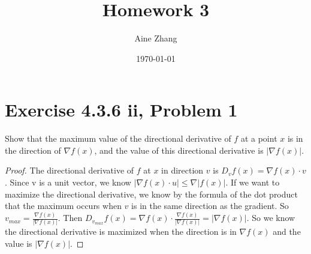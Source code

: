 \documentclass{article}
\title{Homework 3}
\author{Aine Zhang}
\date\today
\begin{document}
\maketitle %

\section*{Exercise 4.3.6 ii, Problem 1}
Show that the maximum value of the directional derivative of $f$ at a point $x$ is in the direction of $\nabla f(x)$, and the value of this directional derivative is $|\nabla f(x)|.$
\begin{proof}
    The directional derivative of $f$ at $x$ in direction $v$ is $D_vf(x)=\nabla f(x) \cdot v$. Since v is a unit vector, we know $|\nabla f(x) \cdot u |\leq \nabla |f(x)|$. If we want to maximize the directional derivative, we know by the formula of the dot product that the maximum occurs when $v$ is in the same direction as the gradient. So $v_{max}=\frac{\nabla f(x)}{|\nabla f(x)|}$. Then $D_{v_{max}}f(x)=\nabla f(x) \cdot \frac{\nabla f(x)}{|\nabla f(x)|}=|\nabla f(x)|.$ So we know the directional derivative is maximized when the direction is in $\nabla f(x)$ and the value is $|\nabla f(x)|.$
\end{proof}


\clearpage %
\end{document}
